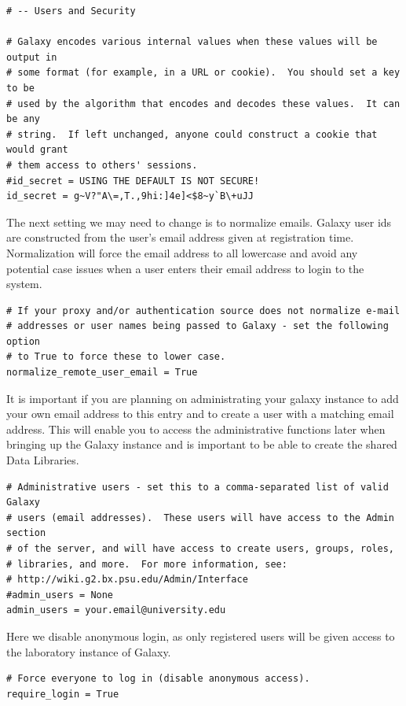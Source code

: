 \documentclass[a4paper,10pt]{article}
\begin{document}
\begin{lstlisting}
# -- Users and Security

# Galaxy encodes various internal values when these values will be output in
# some format (for example, in a URL or cookie).  You should set a key to be
# used by the algorithm that encodes and decodes these values.  It can be any
# string.  If left unchanged, anyone could construct a cookie that would grant
# them access to others' sessions.
#id_secret = USING THE DEFAULT IS NOT SECURE!
id_secret = g~V?"A\=,T.,9hi:]4e]<$8~y`B\+uJJ
\end{lstlisting}

The next setting we may need to change is to normalize emails.  Galaxy user ids are constructed from the user's email address given at registration time.  Normalization will force the email address to all lowercase and avoid any potential case issues when a user enters their email address to login to the system.

\begin{lstlisting}
# If your proxy and/or authentication source does not normalize e-mail
# addresses or user names being passed to Galaxy - set the following option
# to True to force these to lower case.
normalize_remote_user_email = True
\end{lstlisting}

It is important if you are planning on administrating your galaxy instance to add your own email address to this entry and to create a user with a matching email address.  This will enable you to access the administrative functions later when bringing up the Galaxy instance and is important to be able to create the shared Data Libraries.
\begin{lstlisting}
# Administrative users - set this to a comma-separated list of valid Galaxy
# users (email addresses).  These users will have access to the Admin section
# of the server, and will have access to create users, groups, roles,
# libraries, and more.  For more information, see:
# http://wiki.g2.bx.psu.edu/Admin/Interface
#admin_users = None
admin_users = your.email@university.edu
\end{lstlisting}

Here we disable anonymous login, as only registered users will be given access to the laboratory instance of Galaxy.
\begin{lstlisting}
# Force everyone to log in (disable anonymous access).
require_login = True
\end{lstlisting}
\end{document}
